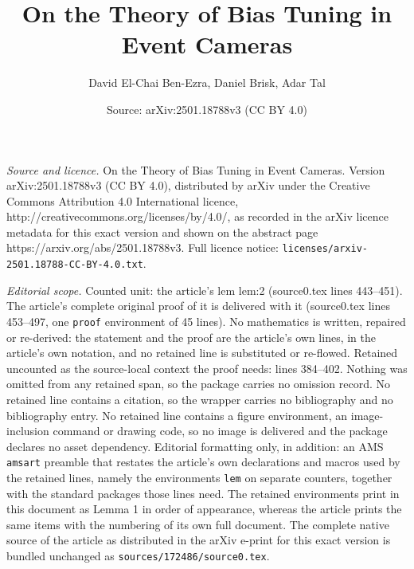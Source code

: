 \documentclass[10pt,a4paper]{amsart}
\title{On the Theory of Bias Tuning in Event Cameras}
\author{David El-Chai Ben-Ezra, Daniel Brisk, Adar Tal}
\date{Source: arXiv:2501.18788v3 (CC BY 4.0)}
\begin{document}
\maketitle

\noindent\emph{Source and licence.} On the Theory of Bias Tuning in Event Cameras. Version arXiv:2501.18788v3 (CC BY 4.0), distributed by arXiv under the Creative Commons Attribution 4.0 International licence, http://creativecommons.org/licenses/by/4.0/, as recorded in the arXiv licence metadata for this exact version and shown on the abstract page https://arxiv.org/abs/2501.18788v3. Full licence notice: \texttt{licenses/arxiv-2501.18788-CC-BY-4.0.txt}.\par\smallskip

\noindent\textit{Editorial scope.} Counted unit: the article's lem lem:2 (source0.tex lines 443--451). The article's complete original proof of it is delivered with it (source0.tex lines 453--497, one \texttt{proof} environment of 45 lines). No mathematics is written, repaired or re-derived: the statement and the proof are the article's own lines, in the article's own notation, and no retained line is substituted or re-flowed.  Retained uncounted as the source-local context the proof needs: lines 384--402.  Nothing was omitted from any retained span, so the package carries no omission record.  No retained line contains a citation, so the wrapper carries no bibliography and no bibliography entry.  No retained line contains a figure environment, an image-inclusion command or drawing code, so no image is delivered and the package declares no asset dependency.  Editorial formatting only, in addition: an AMS \texttt{amsart} preamble that restates the article's own declarations and macros used by the retained lines, namely the environments \texttt{lem} on separate counters, together with the standard packages those lines need.  The retained environments print in this document as Lemma 1 in order of appearance, whereas the article prints the same items with the numbering of its own full document.  The complete native source of the article as distributed in the arXiv e-print for this exact version is bundled unchanged as \texttt{sources/172486/source0.tex}.
\end{document}
